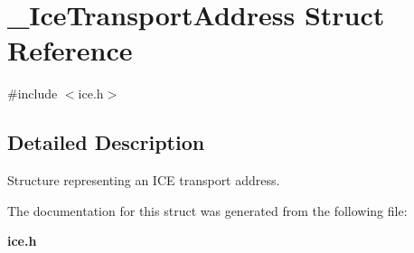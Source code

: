 \section{\_\-IceTransportAddress Struct Reference}
\label{struct__IceTransportAddress}


{\ttfamily \#include $<$ice.h$>$}

\subsection{Detailed Description}
Structure representing an ICE transport address. 

The documentation for this struct was generated from the following file:\begin{DoxyCompactItemize}
\item 
{\bf ice.h}\end{DoxyCompactItemize}
